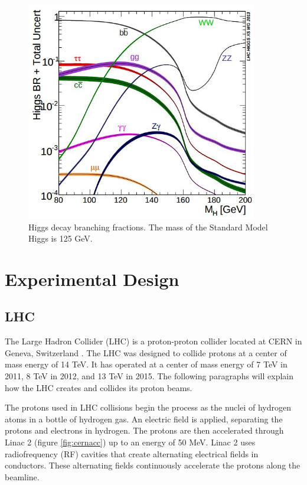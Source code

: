 \documentclass[oneside, letterpaper, oldfontcommands]{memoir}
\begin{document}
\begin{figure}[here]
\includegraphics[width=0.9\textwidth]{higgsBR.jpg}
\caption{Higgs decay branching fractions\cite{Heinemeyer:2013tqa}. The mass of the Standard Model Higgs is 125 GeV. }
\label{fig:higgsBR}
\end{figure}



\chapter{Experimental Design}\label{experiment}

\section{LHC}\label{lhc}

\qquad The Large Hadron Collider (LHC) is a proton-proton collider located at CERN in Geneva, Switzerland \cite{1748-0221-3-08-S08001}. The LHC was designed to collide protons at a center of mass energy of 14 TeV. It has operated at a center of mass energy of 7 TeV in 2011, 8 TeV in 2012, and 13 TeV in 2015. The following paragraphs will explain how the LHC creates and collides its proton beams.

\qquad The protons used in LHC collisions begin the process as the nuclei of hydrogen atoms in a bottle of hydrogen gas. An electric field is applied, separating the protons and electrons in hydrogen. The protons are then accelerated through Linac 2 (figure \ref{fig:cernacc}) up to an energy of 50 MeV. Linac 2 uses radiofrequency (RF) cavities that create alternating electrical fields in conductors. These alternating fields continuously accelerate the protons along the beamline.
\end{document}
